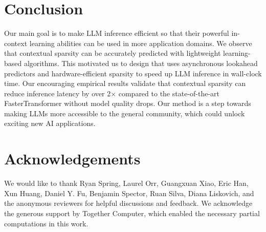 \section{Conclusion}

Our main goal is to make LLM inference efficient so that their powerful in-context learning abilities can be used in more application domains.
We observe that contextual sparsity can be accurately predicted with lightweight learning-based algorithms. This motivated us to design \name{} that uses asynchronous lookahead predictors and hardware-efficient sparsity to speed up LLM inference in wall-clock time. Our encouraging empirical results validate that contextual sparsity can reduce inference latency by over 2$\times$ compared to the state-of-the-art FasterTransformer without model quality drops. 
Our method is a step towards making LLMs more accessible to the general community, which could unlock exciting new AI applications.



\section*{Acknowledgements}
We would like to thank Ryan Spring, Laurel Orr, Guangxuan Xiao, Eric Han, Xun Huang, Daniel Y. Fu, Benjamin Spector, Ruan Silva, Diana Liskovich, and the anonymous reviewers for helpful discussions and feedback. We acknowledge the generous support by Together Computer, which enabled the necessary partial computations in this work.